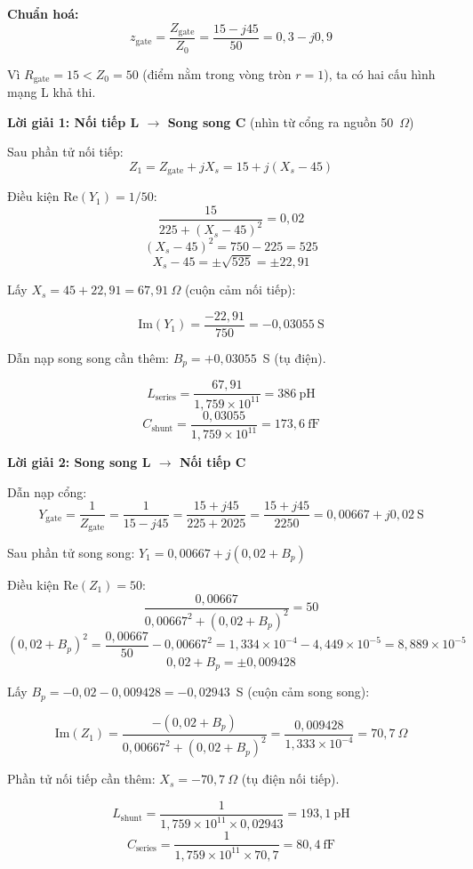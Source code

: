 \documentclass[12pt,a4paper]{article}
\begin{document}
\textbf{Chuẩn hoá:}
\[
z_{\text{gate}} = \frac{Z_{\text{gate}}}{Z_0} = \frac{15 - j45}{50} = 0{,}3 - j0{,}9
\]

Vì $R_{\text{gate}} = 15 < Z_0 = 50$ (điểm nằm trong vòng tròn $r = 1$), ta có hai cấu hình mạng L khả thi.

\textbf{Lời giải 1: Nối tiếp L $\to$ Song song C} (nhìn từ cổng ra nguồn 50~$\Omega$)

Sau phần tử nối tiếp:
\[
Z_1 = Z_{\text{gate}} + jX_s = 15 + j(X_s - 45)
\]

Điều kiện $\text{Re}(Y_1) = 1/50$:
\[
\frac{15}{225 + (X_s - 45)^2} = 0{,}02
\]
\[
(X_s - 45)^2 = 750 - 225 = 525
\]
\[
X_s - 45 = \pm\sqrt{525} = \pm 22{,}91
\]

Lấy $X_s = 45 + 22{,}91 = 67{,}91~\Omega$ (cuộn cảm nối tiếp):

\[
\text{Im}(Y_1) = \frac{-22{,}91}{750} = -0{,}03055~\text{S}
\]

Dẫn nạp song song cần thêm: $B_p = +0{,}03055$~S (tụ điện).

\[
\boxed{L_{\text{series}} = \frac{67{,}91}{1{,}759 \times 10^{11}} = 386~\text{pH}}
\]
\[
\boxed{C_{\text{shunt}} = \frac{0{,}03055}{1{,}759 \times 10^{11}} = 173{,}6~\text{fF}}
\]

\textbf{Lời giải 2: Song song L $\to$ Nối tiếp C}

Dẫn nạp cổng:
\[
Y_{\text{gate}} = \frac{1}{Z_{\text{gate}}} = \frac{1}{15 - j45} = \frac{15 + j45}{225 + 2025} = \frac{15 + j45}{2250} = 0{,}00667 + j0{,}02~\text{S}
\]

Sau phần tử song song: $Y_1 = 0{,}00667 + j(0{,}02 + B_p)$

Điều kiện $\text{Re}(Z_1) = 50$:
\[
\frac{0{,}00667}{0{,}00667^2 + (0{,}02 + B_p)^2} = 50
\]
\[
(0{,}02 + B_p)^2 = \frac{0{,}00667}{50} - 0{,}00667^2 = 1{,}334 \times 10^{-4} - 4{,}449 \times 10^{-5} = 8{,}889 \times 10^{-5}
\]
\[
0{,}02 + B_p = \pm 0{,}009428
\]

Lấy $B_p = -0{,}02 - 0{,}009428 = -0{,}02943$~S (cuộn cảm song song):

\[
\text{Im}(Z_1) = \frac{-(0{,}02 + B_p)}{0{,}00667^2 + (0{,}02 + B_p)^2} = \frac{0{,}009428}{1{,}333 \times 10^{-4}} = 70{,}7~\Omega
\]

Phần tử nối tiếp cần thêm: $X_s = -70{,}7~\Omega$ (tụ điện nối tiếp).

\[
\boxed{L_{\text{shunt}} = \frac{1}{1{,}759 \times 10^{11} \times 0{,}02943} = 193{,}1~\text{pH}}
\]
\[
\boxed{C_{\text{series}} = \frac{1}{1{,}759 \times 10^{11} \times 70{,}7} = 80{,}4~\text{fF}}
\]
\end{document}
